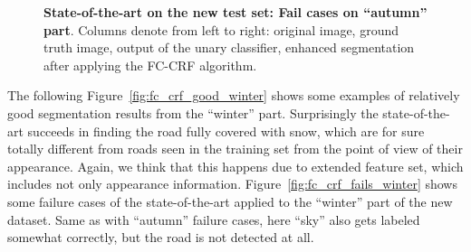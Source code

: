 \begin{figure}[t]
 \caption[State-of-the-art on the new test set: Fail cases on ``autumn'' part]{
 {\bf State-of-the-art on the new test set: Fail cases on ``autumn'' part}.
 Columns denote from left to right: original image, ground truth image, output of the unary classifier, enhanced segmentation after applying
 the FC-CRF algorithm.}\label{fig:fc_crf_fails_autumn}
\end{figure}

The following Figure~\ref{fig:fc_crf_good_winter} shows some examples of relatively good segmentation results from the ``winter'' part. Surprisingly
the state-of-the-art succeeds in finding the road fully covered with snow, which are for sure totally 
different from roads seen in the training set from the point of view of their appearance. Again, we think that this happens due to extended feature set,
which includes not only appearance information. Figure~\ref{fig:fc_crf_fails_winter} shows some failure cases of the state-of-the-art applied to the
``winter'' part of the new dataset. Same as with ``autumn'' failure cases, here ``sky'' also gets labeled somewhat correctly, but the road is not
detected at all.

